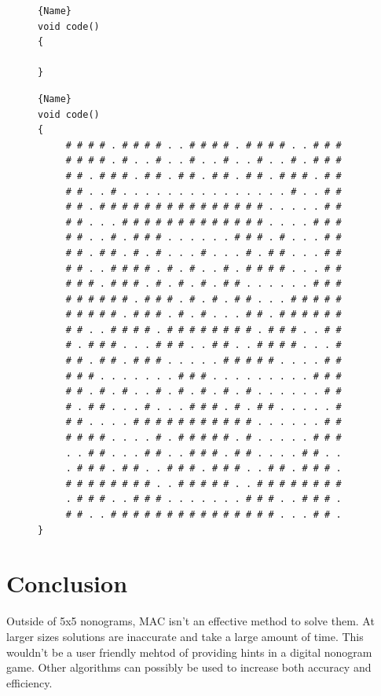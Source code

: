 \documentclass[12pt, letterpaper]
{article}
\begin{document}
\begin{figure}[H]
    \begin{lstlisting}

    \end{lstlisting}
    \noindent\begin{minipage}{.45\textwidth}
\begin{lstlisting}[caption=code 1,frame=tlrb]{Name}
void code()
{

}
\end{lstlisting}
\end{minipage}\hfill
\begin{minipage}{.45\textwidth}
\begin{lstlisting}[caption=code 2,frame=tlrb]{Name}
void code()
{
     # # # # . # # # # . . # # # # . # # # # . . # # #
     # # # # . # . . # . . # . . # . . # . . # . # # #
     # # . # # # . # # . # # . # # . # # . # # # . # #
     # # . . # . . . . . . . . . . . . . . . # . . # #
     # # . # # # # # # # # # # # # # # # . . . . . # #
     # # . . . # # # # # # # # # # # # # . . . . # # #
     # # . . # . # # # . . . . . . # # # . # . . . # #
     # # . # # . # . # . . . # . . . # . # # . . . # #
     # # . . # # # # . # . # . . # . # # # # . . . # #
     # # # . # # # . # . # . # . # # . . . . . . # # #
     # # # # # # . # # # . # . # . # # . . . # # # # #
     # # # # # . # # # . # . # . . . # # . # # # # # #
     # # . . # # # # . # # # # # # # # . # # # . . # #
     # . # # # . . . # # # . . # # . . # # # # . . . #
     # # . # # . # # # . . . . . # # # # # . . . . # #
     # # # . . . . . . . # # # . . . . . . . . . # # #
     # # . # . # . . # . # . # . # . # . . . . . . # #
     # . # # . . . # . . . # # # . # . # # . . . . . #
     # # . . . . # # # # # # # # # # # . . . . . . # #
     # # # # . . . . # . # # # # # . # . . . . . # # #
     . . # # . . . # # . . # # # . # # . . . . # # . .
     . # # # . # # . . # # # . # # # . . # # . # # # .
     # # # # # # # # . . # # # # # . . # # # # # # # #
     . # # # . . # # # . . . . . . . # # # . . # # # .
     # # . . # # # # # # # # # # # # # # # . . . # # .
}
\end{lstlisting}
\end{minipage}
\end{figure}

\section{Conclusion}
Outside of 5x5 nonograms, MAC isn't an effective method to solve them. At larger sizes solutions are inaccurate and take a large amount of time. This wouldn't be a user friendly mehtod of providing hints in a digital nonogram game. Other algorithms can possibly be used to increase both accuracy and efficiency.
\end{document}
